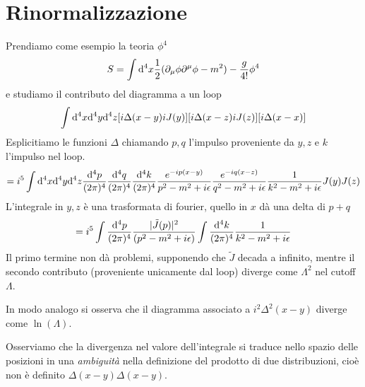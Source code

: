 \documentclass[a4paper, 11pt]{article}
\begin{document}
	
	\section{Rinormalizzazione}
	Prendiamo come esempio la teoria $\phi^4$ 
	\[ S = \int \mathrm{d}^4x \frac{1}{2}(\partial_\mu\phi\partial^\mu\phi-m^2)-\frac{g}{4!}\phi^4 \]
	e studiamo il contributo del diagramma a un loop
	\[ \int\mathrm{d}^4x \mathrm{d}^4y \mathrm{d}^4z [i\Delta(x-y) iJ(y)][i\Delta(x-z)iJ(z)][i\Delta(x-x)] \]
	Esplicitiamo le funzioni $\Delta$ chiamando $p,q$ l'impulso proveniente da $y,z$ e $k$ l'impulso nel loop.
	\[ = i^5 \int \mathrm{d}^4x\mathrm{d}^4y\mathrm{d}^4z \frac{\mathrm{d}^4p}{(2\pi)^4}\frac{\mathrm{d}^4q}{(2\pi)^4}\frac{\mathrm{d}^4k}{(2\pi)^4} \frac{e^{-ip(x-y)}}{p^2-m^2+i\epsilon}\frac{e^{-iq(x-z)}}{q^2-m^2+i\epsilon}\frac{1}{k^2-m^2+i\epsilon} J(y)J(z) \]
	L'integrale in $y,z$ è una trasformata di fourier, quello in $x$ dà una delta di $p+q$
	\[ = i^5 \int \frac{\mathrm{d}^4p}{(2\pi)^4} \frac{|\tilde{J}(p)|^2}{(p^2-m^2+i\epsilon)}\int\frac{\mathrm{d}^4k}{(2\pi)^4}\frac{1}{k^2-m^2+i\epsilon} \]
	Il primo termine non dà problemi, supponendo che $\tilde{J}$ decada a infinito, mentre il secondo contributo (proveniente unicamente dal loop) diverge come $\Lambda^2$ nel cutoff $\Lambda$.
	
	In modo analogo si osserva che il diagramma associato a $i^2\Delta^2(x-y)$ diverge come $\ln(\Lambda)$.%
	
	Osserviamo che la divergenza nel valore dell'integrale si traduce nello spazio delle posizioni in una \emph{ambiguità} nella definizione del prodotto di due distribuzioni, cioè non è definito $\Delta(x-y)\Delta(x-y)$.
	
\end{document}
